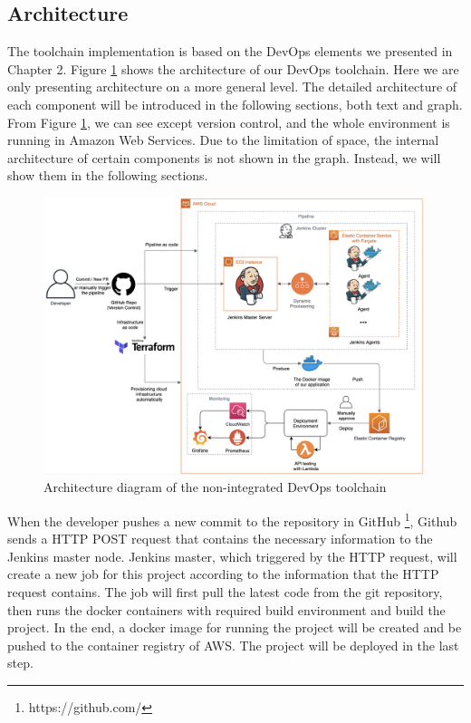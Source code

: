 \subsection{Architecture}
The toolchain implementation is based on the DevOps elements we presented in Chapter 2. Figure \ref{fig:archjenkins} shows the architecture of our DevOps toolchain. Here we are only presenting architecture on a more general level. The detailed architecture of each component will be introduced in the following sections, both text and graph. From Figure \ref{fig:archjenkins}, we can see except version control, and the whole environment is running in Amazon Web Services. Due to the limitation of space, the internal architecture of certain components is not shown in the graph. Instead, we will show them in the following sections.
\begin{figure}[!h]
     \centering
     \includegraphics[width=0.99\textwidth]{pics/arch-med-jenkins.png}
     \caption{Architecture diagram of the non-integrated DevOps toolchain}
     \label{fig:archjenkins}
\end{figure}
\par
When the developer pushes a new commit to the repository in GitHub \footnote{https://github.com/}, Github sends a HTTP POST request that contains the necessary information to the Jenkins master node. Jenkins master, which triggered by the HTTP request, will create a new job for this project according to the information that the HTTP request contains. The job will first pull the latest code from the git repository, then runs the docker containers with required build environment and build the project. In the end, a docker image for running the project will be created and be pushed to the container registry of AWS. The project will be deployed in the last step.

